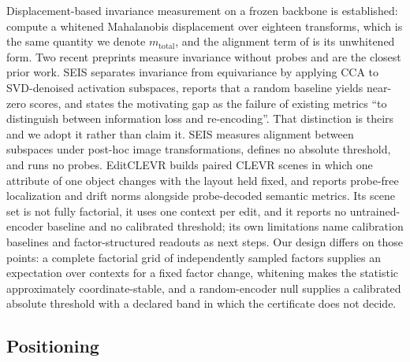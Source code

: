 \documentclass[11pt]{article}
\begin{document}
Displacement-based invariance measurement on a frozen backbone is
established: \citet{ericsson2022why} compute a whitened Mahalanobis
displacement over eighteen transforms, which is the same quantity we
denote $m_{\mathrm{total}}$, and the alignment term of
\citet{wang2020understanding} is its unwhitened form. Two recent preprints measure
invariance without probes and are the closest prior work. SEIS
\citep{lin2026seis} separates invariance from equivariance by applying
CCA to SVD-denoised activation subspaces, reports that a random baseline
yields near-zero scores, and states the motivating gap as the failure of
existing metrics ``to distinguish between information loss and
re-encoding''. That distinction is theirs and we adopt it rather than
claim it. SEIS measures alignment between subspaces under post-hoc image
transformations, defines no absolute threshold, and runs no probes.
EditCLEVR \citep{karnam2026editclevr} builds paired CLEVR scenes in which
one attribute of one object changes with the layout held fixed, and
reports probe-free localization and drift norms alongside probe-decoded
semantic metrics. Its scene set is not fully factorial, it uses one
context per edit, and it reports no untrained-encoder baseline and no
calibrated threshold; its own limitations name calibration baselines and
factor-structured readouts as next steps. Our design differs on those
points: a complete factorial grid of independently sampled factors
supplies an expectation over contexts for a fixed factor change,
whitening makes the statistic approximately coordinate-stable, and a
random-encoder null supplies a calibrated absolute threshold with a
declared band in which the certificate does not decide.

\subsection{Positioning}
\end{document}
